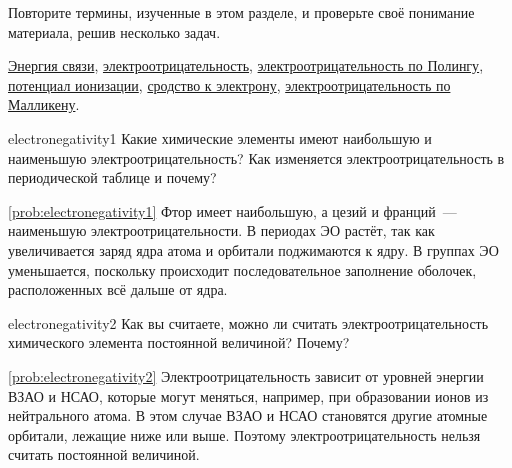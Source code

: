 Повторите термины, изученные в этом разделе, и проверьте своё понимание материала, решив несколько задач.

\begin{termlist}
    \hyperref[term:bond_energy]{Энергия связи},
    \hyperref[term:electronegativity]{электроотрицательность},
    \hyperref[term:Pauling_electronegativity]{электроотрицательность по Полингу},
    \hyperref[term:ionization_energy]{потенциал ионизации},
    \hyperref[term:electron_affinity]{сродство к электрону},
    \hyperref[term:Mulliken_electronegativity]{электроотрицательность по Малликену}.
\end{termlist}

\begin{problem}{}{electronegativity1}
    Какие химические элементы имеют наибольшую и наименьшую электроотрицательность? Как изменяется электроотрицательность в периодической таблице и почему?

    \begin{sol}{\ref{prob:electronegativity1}}
        Фтор имеет наибольшую, а цезий и франций~--- наименьшую электроотрицательности.
        \medskip
        В периодах ЭО растёт, так как увеличивается заряд ядра атома и орбитали поджимаются к ядру. В группах ЭО уменьшается, поскольку происходит последовательное заполнение оболочек, расположенных всё дальше от ядра.
    \end{sol}
\end{problem}

\begin{problem}{}{electronegativity2}
    Как вы считаете, можно ли считать электроотрицательность химического элемента постоянной величиной? Почему?

    \begin{sol}{\ref{prob:electronegativity2}}
        Электроотрицательность зависит от уровней энергии ВЗАО и НСАО, которые могут меняться, например, при образовании ионов из нейтрального атома. В этом случае ВЗАО и НСАО становятся другие атомные орбитали, лежащие ниже или выше. Поэтому электроотрицательность нельзя считать постоянной величиной.
    \end{sol}
\end{problem}

